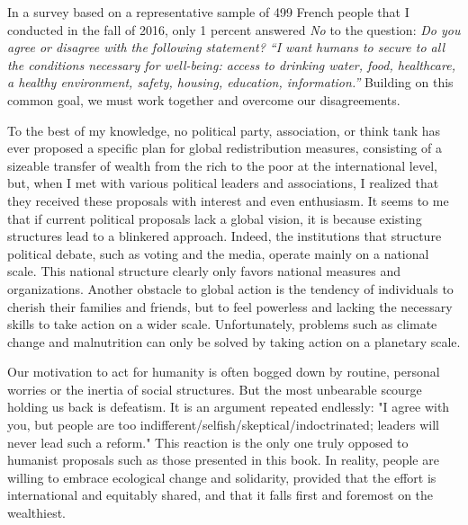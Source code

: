 \documentclass[a5paper,english,openany]{memoir}
\begin{document}
In a survey based on a representative sample of 499 
French people that %
I conducted in the fall %
of 2016, only 1 percent %
answered \textit{No} to the question: \textit{Do you agree or disagree with the following statement? ``I want humans to secure to all the conditions necessary for well-being: access to drinking water, food, healthcare, a healthy environment, safety, housing, education, information.''}
Building on this common goal, we must %
work together and overcome our disagreements.

To the best of my knowledge, no political party, association, %
or think tank has ever proposed a specific plan for global redistribution measures, consisting of a sizeable transfer of wealth from the rich to the poor at the international level, %
but, %
when I met with various political leaders and associations, I realized %
that they received these proposals with interest and even enthusiasm. It seems to me that if current political proposals lack a global vision, it is because existing structures lead to a blinkered approach. %
Indeed, the institutions that structure political debate, such as voting and the media, operate mainly %
on a national scale. %
This national structure clearly only favors %
national measures and organizations. %
Another obstacle to global action is the tendency of individuals to cherish their families and friends,
but %
to feel powerless and lacking the necessary skills %
to take action on a wider scale.
Unfortunately, problems such as climate change and malnutrition can only be solved by taking action on a planetary scale. 

Our motivation to act for humanity is often bogged down by routine, personal worries or the inertia of social structures. %
But the most unbearable scourge holding us back is defeatism. It is an %
argument repeated endlessly: %
"I agree with you, but people are too indifferent/selfish/skeptical/indoctrinated; %
leaders will never lead such a reform." %
This reaction is the only one truly opposed to humanist proposals such as %
those presented in this book. 
In reality, people are willing to embrace ecological change and solidarity, provided that the effort is international and equitably shared, and that it falls first and foremost on the wealthiest. %
\end{document}

